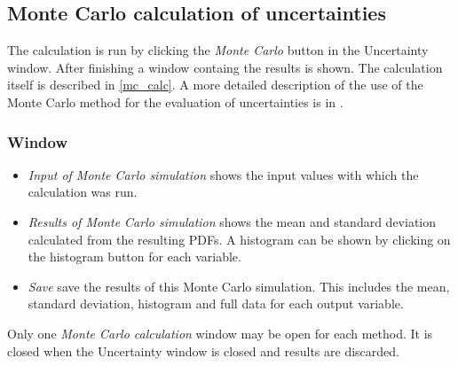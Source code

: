 %
%
\subsection{Monte Carlo calculation of uncertainties} \label{mc}
The calculation is run by clicking the \emph{Monte Carlo} button in the Uncertainty window. After finishing a window containg the results is shown. The calculation itself is described in \ref{mc_calc}.
A more detailed description of the use of the Monte Carlo method for the evaluation of uncertainties is in \cite{GUMSupplement1, GUMSupplement2}. 

\subsubsection{Window}
\begin{itemize}
 \item \emph{Input of Monte Carlo simulation} shows the input values with which the calculation was run.
 \item \emph{Results of Monte Carlo simulation} shows the mean and standard deviation calculated from the resulting PDFs. A histogram can be shown by clicking on the histogram button for each variable.
 \item \emph{Save} save the results of this Monte Carlo simulation. This includes the mean, standard deviation, histogram and full data for each output variable.
\end{itemize}
Only one \emph{Monte Carlo calculation} window may be open for each method. It is closed when the Uncertainty window is closed and results are discarded.

